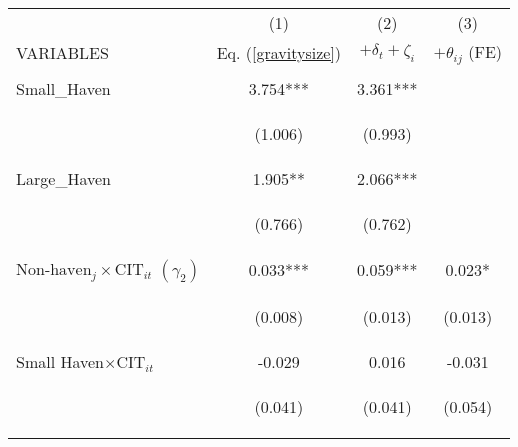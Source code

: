 \begin{center}
\begin{tabular}{lccc} \hline
 & (1) & (2) & (3) \\
VARIABLES & Eq. (\ref{gravitysize}) & $+\delta_t+\zeta_i$ & $+\theta_{ij}$ (FE) \\ \hline
\vspace{4pt} & \begin{footnotesize}\end{footnotesize} & \begin{footnotesize}\end{footnotesize} & \begin{footnotesize}\end{footnotesize} \\
Small\_Haven & 3.754*** & 3.361*** &  \\
\vspace{4pt} & \begin{footnotesize}(1.006)\end{footnotesize} & \begin{footnotesize}(0.993)\end{footnotesize} & \begin{footnotesize}\end{footnotesize} \\
Large\_Haven & 1.905** & 2.066*** &  \\
\vspace{4pt} & \begin{footnotesize}(0.766)\end{footnotesize} & \begin{footnotesize}(0.762)\end{footnotesize} & \begin{footnotesize}\end{footnotesize} \\
$\text{Non-haven}_j\times\text{CIT}_{it}$ $ (\gamma_2)$ & 0.033*** & 0.059*** & 0.023* \\
\vspace{4pt} & \begin{footnotesize}(0.008)\end{footnotesize} & \begin{footnotesize}(0.013)\end{footnotesize} & \begin{footnotesize}(0.013)\end{footnotesize} \\
Small Haven$\times\text{CIT}_{it}$ & -0.029 & 0.016 & -0.031 \\
\vspace{4pt} & \begin{footnotesize}(0.041)\end{footnotesize} & \begin{footnotesize}(0.041)\end{footnotesize} & \begin{footnotesize}(0.054)\end{footnotesize} \\

\end{tabular}
\end{center}
